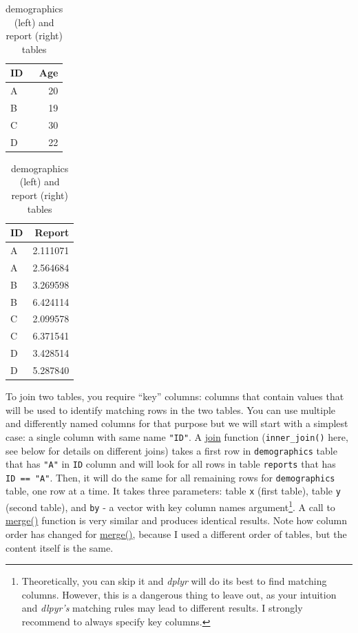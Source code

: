 \documentclass[
]{book}
\begin{document}
\begin{table}
\caption{\label{tab:unnamed-chunk-175}demographics (left) and report (right) tables}

\centering
\begin{tabular}[t]{l|r}
\hline
ID & Age\\
\hline
A & 20\\
\hline
B & 19\\
\hline
C & 30\\
\hline
D & 22\\
\hline
\end{tabular}
\centering
\begin{tabular}[t]{l|r}
\hline
ID & Report\\
\hline
A & 2.111071\\
\hline
A & 2.564684\\
\hline
B & 3.269598\\
\hline
B & 6.424114\\
\hline
C & 2.099578\\
\hline
C & 6.371541\\
\hline
D & 3.428514\\
\hline
D & 5.287840\\
\hline
\end{tabular}
\end{table}

To join two tables, you require ``key'' columns: columns that contain values that will be used to identify matching rows in the two tables. You can use multiple and differently named columns for that purpose but we will start with a simplest case: a single column with same name \texttt{"ID"}. A \href{https://dplyr.tidyverse.org/reference/mutate-joins.html}{join} function (\texttt{inner\_join()} here, see below for details on different joins) takes a first row in \texttt{demographics} table that has \texttt{"A"} in \texttt{ID} column and will look for all rows in table \texttt{reports} that has \texttt{ID\ ==\ "A"}. Then, it will do the same for all remaining rows for \texttt{demographics} table, one row at a time. It takes three parameters: table \texttt{x} (first table), table \texttt{y} (second table), and \texttt{by} - a vector with key column names argument\footnote{Theoretically, you can skip it and \emph{dplyr} will do its best to find matching columns. However, this is a dangerous thing to leave out, as your intuition and \emph{dlpyr's} matching rules may lead to different results. I strongly recommend to always specify key columns.}. A call to \href{https://stat.ethz.ch/R-manual/R-devel/library/base/html/merge.html}{merge()} function is very similar and produces identical results. Note how column order has changed for \href{https://stat.ethz.ch/R-manual/R-devel/library/base/html/merge.html}{merge()}, because I used a different order of tables, but the content itself is the same.
\end{document}
